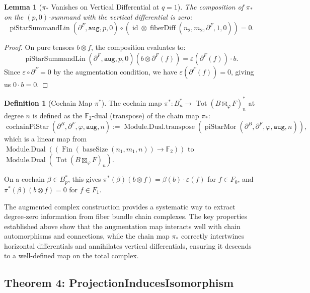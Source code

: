 \documentclass[11pt]{article}
\theoremstyle{plain}
\newtheorem*{lemma}{Lemma}
\theoremstyle{definition}
\newtheorem*{definition}{Definition}
\theoremstyle{remark}
\begin{document}
\begin{lemma}[$\pi_*$ Vanishes on Vertical Differential at $q = 1$]
The composition of $\pi_*$ on the $(p,0)$-summand with the vertical differential is zero:
\[
\operatorname{piStarSummandLin}(\partial^F, \mathtt{aug}, p, 0)
\circ
(\operatorname{id} \otimes \operatorname{fiberDiff}(n_2, m_2, \partial^F, 1, 0))
= 0.
\]
\end{lemma}

\begin{proof}
On pure tensors $b \otimes f$, the composition evaluates to:
\[
\operatorname{piStarSummandLin}(\partial^F, \mathtt{aug}, p, 0)(b \otimes \partial^F(f)) = \varepsilon(\partial^F(f)) \cdot b.
\]
Since $\varepsilon \circ \partial^F = 0$ by the augmentation condition, we have $\varepsilon(\partial^F(f)) = 0$, giving us $0 \cdot b = 0$.
\end{proof}

\begin{definition}[Cochain Map $\pi^*$]
The cochain map $\pi^* : B^*_n \to \operatorname{Tot}(B \boxtimes_\varphi F)^*_n$ at degree $n$ is defined as the $\mathbb{F}_2$-dual (transpose) of the chain map $\pi_*$:
\[
\operatorname{cochainPiStar}(\partial^B, \partial^F, \varphi, \mathtt{aug}, n)
:=
\operatorname{Module.Dual.transpose}(\operatorname{piStarMor}(\partial^B, \partial^F, \varphi, \mathtt{aug}, n)),
\]
which is a linear map from $\operatorname{Module.Dual}((\operatorname{Fin}(\operatorname{baseSize}(n_1,m_1,n)) \to \mathbb{F}_2))$ to $\operatorname{Module.Dual}(\operatorname{Tot}(B \boxtimes_\varphi F)_n)$.

On a cochain $\beta \in B^*_p$, this gives $\pi^*(\beta)(b \otimes f) = \beta(b) \cdot \varepsilon(f)$ for $f \in F_0$, and $\pi^*(\beta)(b \otimes f) = 0$ for $f \in F_1$.
\end{definition}

The augmented complex construction provides a systematic way to extract degree-zero information from fiber bundle chain complexes. The key properties established above show that the augmentation map interacts well with chain automorphisms and connections, while the chain map $\pi_*$ correctly intertwines horizontal differentials and annihilates vertical differentials, ensuring it descends to a well-defined map on the total complex.

\vspace{1em}

\subsection{Theorem 4: ProjectionInducesIsomorphism}
\end{document}
